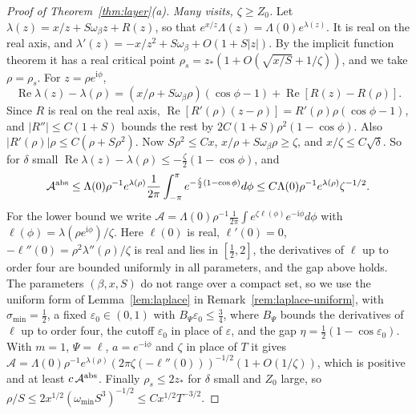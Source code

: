 \begin{proof}[Proof of Theorem~\ref{thm:layer}\textup{(a)}]
\emph{Many visits, $\zeta\ge Z_0$.} Let $\lambda(z)=x/z+S\omega_\beta z+R(z)$, so that
$e^{x/z}\Lambda(z)=\Lambda(0)e^{\lambda(z)}$. It is real on the real axis, and
$\lambda'(z)=-x/z^2+S\omega_\beta+O(1+S|z|)$. By the implicit function theorem it has a real
critical point $\rho_s=z_*(1+O(\sqrt{x/S}+1/\zeta))$, and we take $\rho=\rho_s$. For
$z=\rho e^{\mathrm i\phi}$,
\[
\operatorname{Re}\lambda(z)-\lambda(\rho)=(x/\rho+S\omega_\beta\rho)(\cos\phi-1)+\operatorname{Re}[R(z)-R(\rho)] .
\]
Since $R$ is real on the real axis, $\operatorname{Re}[R'(\rho)(z-\rho)]=R'(\rho)\rho(\cos\phi-1)$,
and $|R''|\le C(1+S)$ bounds the rest by $2C(1+S)\rho^2(1-\cos\phi)$. Also
$|R'(\rho)|\rho\le C(\rho+S\rho^2)$. Now $S\rho^2\le Cx$, $x/\rho+S\omega_\beta\rho\ge\zeta$,
and $x/\zeta\le C\sqrt\delta$. So for $\delta$ small
$\operatorname{Re}\lambda(z)-\lambda(\rho)\le-\frac\zeta2(1-\cos\phi)$, and
\[
\mathcal A^{\rm abs}\le\Lambda(0)\rho^{-1}e^{\lambda(\rho)}\frac1{2\pi}\int_{-\pi}^\pi e^{-\frac\zeta2(1-\cos\phi)}d\phi
\le C\Lambda(0)\rho^{-1}e^{\lambda(\rho)}\zeta^{-1/2}.
\]
For the lower bound we write
$\mathcal A=\Lambda(0)\rho^{-1}\frac1{2\pi}\int e^{\zeta\ell(\phi)}e^{-\mathrm i\phi}d\phi$ with
$\ell(\phi)=\lambda(\rho e^{\mathrm i\phi})/\zeta$. Here $\ell(0)$ is real, $\ell'(0)=0$,
$-\ell''(0)=\rho^2\lambda''(\rho)/\zeta$ is real and lies in $[\frac12,2]$, the derivatives of
$\ell$ up to order four are bounded uniformly in all parameters, and the gap above holds. The
parameters $(\beta,x,S)$ do not range over a compact set, so we use the uniform form of
Lemma~\ref{lem:laplace} in Remark~\ref{rem:laplace-uniform}, with $\sigma_{\min}=\frac12$, a fixed
$\varepsilon_0\in(0,1)$ with $B_\Psi\varepsilon_0\le\frac34$, where $B_\Psi$ bounds the derivatives of
$\ell$ up to order four, the cutoff $\varepsilon_0$ in place of $\varepsilon$, and the gap
$\eta=\frac12(1-\cos\varepsilon_0)$. With $m=1$, $\Psi=\ell$, $a=e^{-\mathrm i\phi}$ and $\zeta$ in place
of $T$ it gives
$\mathcal A=\Lambda(0)\rho^{-1}e^{\lambda(\rho)}(2\pi\zeta(-\ell''(0)))^{-1/2}(1+O(1/\zeta))$,
which is positive and at least $c\,\mathcal A^{\rm abs}$. Finally $\rho_s\le2z_*$ for $\delta$ small
and $Z_0$ large, so $\rho/S\le2x^{1/2}(\omega_{\min}S^3)^{-1/2}\le Cx^{1/2}T^{-3/2}$.
\end{proof}

